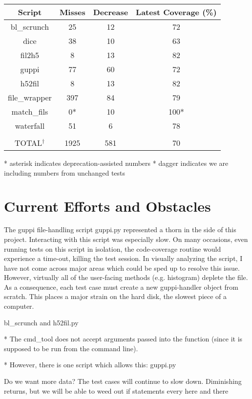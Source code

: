 \documentclass[12pt]{article}
\begin{document}
\begin{center}
 \begin{tabular}{||c c c c||} 
 \hline
 Script & Misses & Decrease & Latest Coverage (\%)\\ [0.5ex] 
\hline
bl\_scrunch & 25 & 12 & 72 \\
\hline
dice & 38 & 10 & 63 \\
\hline
fil2h5 & 8 & 13 & 82 \\
\hline
guppi & 77 & 60 & 72 \\
\hline
h52fil & 8 & 13 & 82 \\
\hline
file\_wrapper & 397 & 84 & 79 \\
\hline
match\_fils & 0* & 10 & 100* \\
\hline
waterfall & 51 & 6 & 78 \\
\hline
&&&
\\
\hline
TOTAL$^\dagger$ & 1925 & 581 & 70 \\ [1ex] 
\hline
\end{tabular}
\end{center}

* asterisk indicates deprecation-assisted numbers
* dagger indicates we are including numbers from unchanged tests

\section{Current Efforts and Obstacles}

\quad \quad The guppi file-handling script guppi.py represented a thorn in the side of this project. Interacting with this script was especially slow. On many occasions, even running tests on this script in isolation, the code-coverage routine would experience a time-out, killing the test session. In visually analyzing the script, I have not come across major areas which could be sped up to resolve this issue. However, virtually all of the user-facing methods (e.g. histogram) deplete the file. As a consequence, each test case must create a new guppi-handler object from scratch. This places a major strain on the hard disk, the slowest piece of a computer.

bl\_scrunch and h52fil.py
    
		* The cmd\_tool does not accept arguments passed into the function (since it is supposed to be run from the command line).
		
    * However, there is one script which allows this: guppi.py

Do we want more data? The test cases will continue to slow down. Diminishing returns,
	but we will be able to weed out if statements every here and there
\end{document}
